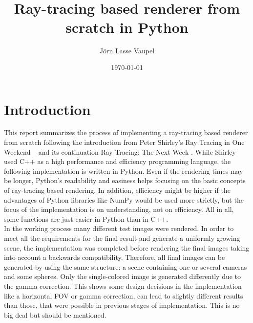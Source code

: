 \documentclass[]{article}
\title{Ray-tracing based renderer from scratch in Python}
\author{Jörn Lasse Vaupel}
\date{\today}
\begin{document}
	
	\maketitle
	\newpage
	\tableofcontents
	
	\begin{abstract}
		
	\end{abstract}

	\newpage
	
	\section{Introduction}
	This report summarizes the process of implementing a ray-tracing based renderer from scratch following the introduction from Peter Shirley’s Ray Tracing in One Weekend  ~\cite{Shirley2020RTW1} and its continuation Ray Tracing: The Next Week \cite{Shirley2020RTW2}. While Shirley used C++ as a high performance and efficiency programming language, the following implementation is written in Python.  Even if the rendering times may be longer, Python’s readability and easiness helps focusing on the basic concepts of ray-tracing based rendering. In addition, efficiency might be higher if the advantages of Python libraries like NumPy would be used more strictly, but the focus of the implementation is on understanding, not on efficiency. All in all, some functions are just easier in Python than in C++.
	\\
	In the working process many different test images were rendered. In order to meet all the requirements for the final result and generate a uniformly growing scene, the implementation was completed before rendering the final images taking into account a backwards compatibility. Therefore, all final images can be generated by using the same structure: a scene containing one or several cameras and some spheres. Only the single-colored image is generated differently due to the gamma correction. This shows some design decisions in the implementation like a horizontal FOV or gamma correction, can lead to slightly different results than those, that were possible in previous stages of implementation. This is no big deal but should be mentioned.
	
\end{document}
